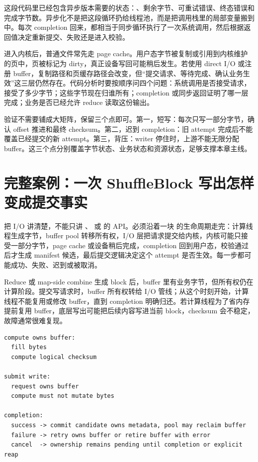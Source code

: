 这段代码里已经包含异步版本需要的状态：、剩余字节、可重试错误、终态错误和完成字节数。异步化不是把这段循环扔给线程池，而是把调用栈里的局部变量搬到  中。每次 completion 回来，都相当于同步循环执行了一次系统调用，然后根据返回值决定重新提交、失败还是进入校验。

 进入内核后，普通文件常先走 page cache。用户态字节被复制或引用到内核维护的页中，页被标记为 dirty，真正设备写回可能稍后发生。若使用 direct I/O 或注册 buffer，复制路径和页缓存路径会改变，但“提交请求、等待完成、确认业务生效”这三层仍然存在。代码分析时要按顺序问四个问题：系统调用是否接受请求，接受了多少字节；这些字节现在归谁所有；completion 或同步返回证明了哪一层完成；业务是否已经允许 reduce 读取这份输出。

验证不需要铺成大矩阵，保留三个点即可。第一，短写：每次只写一部分字节，确认 offset 推进和最终 checksum。第二，迟到 completion：旧 attempt 完成后不能覆盖已经提交的新 attempt。第三，背压：writer 停住时，上游不能无限分配 buffer。这三个点分别覆盖字节状态、业务状态和资源状态，足够支撑本章主线。

\section{完整案例：一次 ShuffleBlock 写出怎样变成提交事实}

把 I/O 讲清楚，不能只讲 、 或  的 API。必须沿着一块  的生命周期走完：计算线程生成字节，buffer pool 转移所有权，I/O 层把请求提交给内核，内核可能只接受一部分字节，page cache 或设备稍后完成，completion 回到用户态，校验通过后才生成 manifest 候选，最后提交逻辑决定这个 attempt 是否生效。每一步都可能成功、失败、迟到或被取消。

Reduce 或 map-side combine 生成 block 后，buffer 里有业务字节，但所有权仍在计算阶段。提交写请求时，buffer 所有权转给 I/O 管线；从这个时刻开始，计算线程不能复用或修改 buffer，直到 completion 明确归还。若计算线程为了省内存提前复用 buffer，底层写出可能把后续内容写进当前 block，checksum 会不稳定，故障通常很难复现。

\begin{lstlisting}[numbers=none,caption={buffer 所有权转移账本}]
compute owns buffer:
  fill bytes
  compute logical checksum

submit write:
  request owns buffer
  compute must not mutate bytes

completion:
  success -> commit candidate owns metadata, pool may reclaim buffer
  failure -> retry owns buffer or retire buffer with error
  cancel  -> ownership remains pending until completion or explicit reap
\end{lstlisting}

